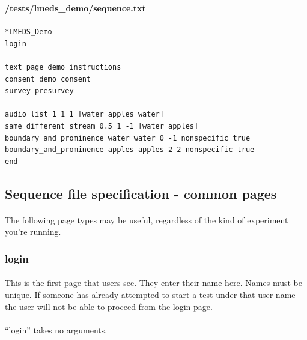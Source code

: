 \documentclass[12pt, oneside]{scrbook}   	%
\begin{document}
\textbf{/tests/lmeds\_demo/sequence.txt}

\paragraph{}

\begin{tcolorbox}[breakable,colback=white,colframe=blue,width=\dimexpr\textwidth+12mm\relax,enlarge left by=-6mm,enlarge right by=6mm]

\begin{lstlisting}
*LMEDS_Demo
login

text_page demo_instructions
consent demo_consent
survey presurvey

audio_list 1 1 1 [water apples water]
same_different_stream 0.5 1 -1 [water apples]
boundary_and_prominence water water 0 -1 nonspecific true
boundary_and_prominence apples apples 2 2 nonspecific true
end
\end{lstlisting}
\end{tcolorbox}

\subsection{Sequence file specification - common pages}
\label{sec:sequenceSpecBasic}

\paragraph{}
The following page types may be useful, regardless of the kind of experiment you're running.

\subsubsection{login}

\paragraph{}
This is the first page that users see.  They enter their name here.  Names must be unique.  If someone has already attempted to start a test under that user name the user will not be able to proceed from the login page.

\paragraph{}
``login'' takes no arguments.
\end{document}
